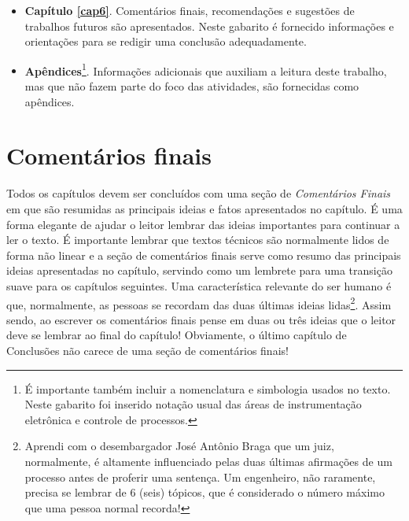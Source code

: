 \begin{itemize}
    \item \textbf{Capítulo \ref{cap6}}. Comentários finais, recomendações e sugestões de trabalhos futuros são apresentados.
    Neste gabarito é  fornecido informações e orientações para se redigir uma conclusão adequadamente.
    
    \item \textbf{Apêndices}\footnote{É importante também incluir a nomenclatura e simbologia usados no texto. Neste gabarito foi inserido notação usual das áreas de instrumentação eletrônica e controle de processos.}. Informações adicionais que auxiliam a leitura deste trabalho, mas que não fazem parte do foco das atividades,    são fornecidas como apêndices.  
  
\end{itemize}


\section{Comentários finais}

Todos os capítulos devem ser concluídos com uma seção de \emph{Comentários Finais} em que são resumidas as principais ideias e fatos apresentados no capítulo. É uma forma elegante de ajudar o leitor  lembrar das ideias importantes para continuar a ler o texto. É importante lembrar que textos técnicos são normalmente lidos de forma não linear e a seção de comentários finais serve como resumo das principais ideias apresentadas no capítulo, servindo como um lembrete para uma transição suave para os capítulos seguintes. Uma característica relevante do ser humano é que, normalmente, as pessoas se recordam das duas últimas ideias lidas\footnote{Aprendi com o desembargador José Antônio Braga que um  juiz, normalmente, é altamente influenciado pelas  duas últimas afirmações de um processo antes de proferir uma sentença. Um engenheiro, não raramente, precisa se lembrar de 6 (seis) tópicos, que é considerado o número máximo que uma pessoa normal recorda!}. Assim sendo, ao escrever os comentários finais pense em duas ou três ideias que o leitor deve se lembrar ao final do capítulo! Obviamente, o último capítulo de Conclusões não carece de uma seção de comentários finais!